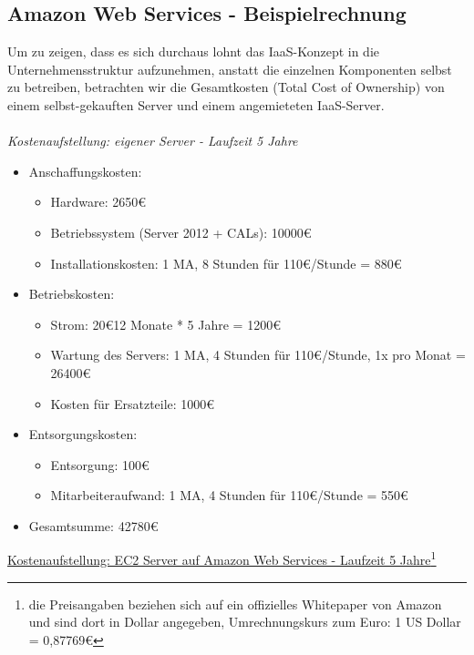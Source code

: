 \subsection{Amazon Web Services - Beispielrechnung}
Um zu zeigen, dass es sich durchaus lohnt das IaaS-Konzept in die
Unternehmensstruktur aufzunehmen, anstatt die einzelnen Komponenten selbst zu
betreiben, betrachten wir die Gesamtkosten (Total Cost of Ownership) von einem
selbst-gekauften Server und einem angemieteten IaaS-Server.
\\ \\
\emph{Kostenaufstellung: eigener Server - Laufzeit 5 Jahre}
\begin{itemize}
  \item Anschaffungskosten:
  	\begin{itemize}
  	  \item Hardware: 2650\euro
  	  \item Betriebssystem (Server 2012 + CALs): 10000\euro
  	  \item Installationskosten: 1 MA, 8 Stunden für 110\euro/Stunde = 880\euro
  	\end{itemize}
  \item Betriebskosten:
  	\begin{itemize}
  	  \item Strom: 20\euro * 12 Monate * 5 Jahre = 1200\euro
  	  \item Wartung des Servers: 1 MA, 4 Stunden für 110\euro/Stunde, 1x pro
  	  Monat = 26400\euro
  	  \item Kosten für Ersatzteile: 1000\euro
  	\end{itemize}
  \item Entsorgungskosten:
  	\begin{itemize}
  	  \item Entsorgung: 100\euro
  	  \item Mitarbeiteraufwand: 1 MA, 4 Stunden für 110\euro/Stunde = 550\euro
  	\end{itemize}
  \item Gesamtsumme: 42780\euro
\end{itemize}
\underline{Kostenaufstellung: EC2 Server auf Amazon Web Services - Laufzeit 5
Jahre\footnote{die Preisangaben beziehen sich auf ein offizielles Whitepaper
von Amazon und sind dort in Dollar angegeben, Umrechnungskurs zum Euro: 1 US
Dollar = 0,87769€}}
